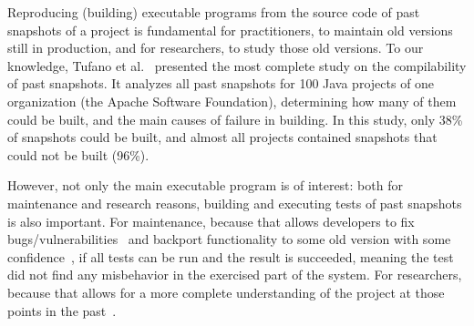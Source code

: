 
Reproducing (building) executable programs from the source code of past snapshots
 of a project is fundamental for practitioners, to maintain old versions still in production, and for researchers, to study those old versions. 
To our knowledge, Tufano et al.~\cite{tufano2017there} presented the most complete study on the compilability of past snapshots.
It analyzes all past snapshots for 100 Java projects of one organization (the Apache Software Foundation), determining how many of them could be built, and the main causes of failure in building. 
In this study, only 38\% of snapshots could be built, and almost all projects contained snapshots that could not be built (96\%).

However, not only the main executable program is of interest: both for maintenance and research reasons, building and executing tests of past snapshots is also important. 
For maintenance, because that allows developers to fix bugs/vulnerabilities~\cite{bartelsoftware} and backport functionality to some old version with some confidence~\cite{tian2017mining}, if all tests can be run and the result is succeeded, meaning the test did not find any misbehavior in the exercised part of the system. 
For researchers, because that allows for a more complete understanding of the project at those points in the past~\cite{santos2019mind}.



